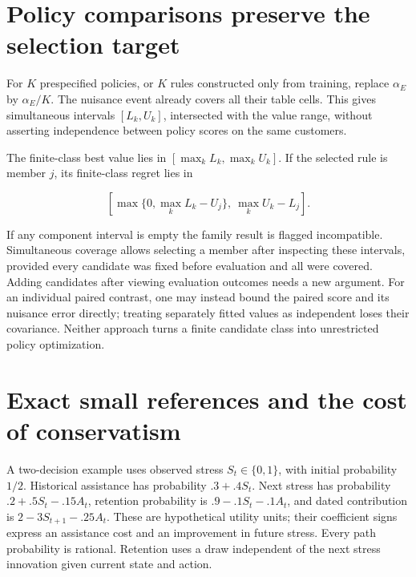 \hypertarget{policy-comparisons-preserve-the-selection-target}{%
\section{Policy comparisons preserve the selection
target}\label{policy-comparisons-preserve-the-selection-target}}

For \(K\) prespecified policies, or \(K\) rules constructed only from
training, replace \(\alpha_E\) by \(\alpha_E/K\). The nuisance event
already covers all their table cells. This gives simultaneous intervals
\([L_k,U_k]\), intersected with the value range, without asserting
independence between policy scores on the same customers.

The finite-class best value lies in \([\max_k L_k,\max_k U_k]\). If the
selected rule is member \(j\), its finite-class regret lies in

\[
 \left[\max\{0,\max_k L_k-U_j\},\ \max_k U_k-L_j\right].
\]

If any component interval is empty the family result is flagged
incompatible. Simultaneous coverage allows selecting a member after
inspecting these intervals, provided every candidate was fixed before
evaluation and all were covered. Adding candidates after viewing
evaluation outcomes needs a new argument. For an individual paired
contrast, one may instead bound the paired score and its nuisance error
directly; treating separately fitted values as independent loses their
covariance. Neither approach turns a finite candidate class into
unrestricted policy optimization.

\hypertarget{exact-small-references-and-the-cost-of-conservatism}{%
\section{Exact small references and the cost of
conservatism}\label{exact-small-references-and-the-cost-of-conservatism}}

A two-decision example uses observed stress \(S_t\in\{0,1\}\), with
initial probability \(1/2\). Historical assistance has probability
\(.3+.4S_t\). Next stress has probability \(.2+.5S_t-.15A_t\), retention
probability is \(.9-.1S_t-.1A_t\), and dated contribution is
\(2-3S_{t+1}-.25A_t\). These are hypothetical utility units; their
coefficient signs express an assistance cost and an improvement in
future stress. Every path probability is rational. Retention uses a draw
independent of the next stress innovation given current state and
action.

